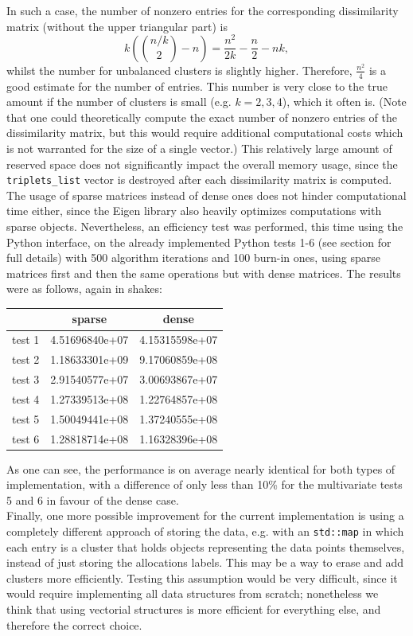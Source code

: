 In such a case, the number of nonzero entries for the corresponding dissimilarity matrix (without the upper triangular part) is
$$ k \left(\binom{n/k}{2} - n\right) = \frac{n^2}{2k} -\frac{n}{2} - nk,$$
whilst the number for unbalanced clusters is slightly higher.
Therefore, $\frac{n^2}{4}$ is a good estimate for the number of entries.
This number is very close to the true amount if the number of clusters is small (e.g. $k=2,3,4$), which it often is. (Note that one could theoretically compute the exact number of nonzero entries of the dissimilarity matrix, but this would require additional computational costs which is not warranted for the size of a single vector.)
This relatively large amount of reserved space does not significantly impact the overall memory usage, since the \verb|triplets_list| vector is destroyed after each dissimilarity matrix is computed. \\
The usage of sparse matrices instead of dense ones does not hinder computational time either, since the Eigen library also heavily optimizes computations with sparse objects.
Nevertheless, an efficiency test was performed, this time using the Python interface, on the already implemented Python tests 1-6 (see section \label{chap-py-test} for full details) with 500 algorithm iterations and 100 burn-in ones, using sparse matrices first and then the same operations but with dense matrices.
The results were as follows, again in shakes:
\begin{center}
	\begin{tabular}{c|c|c}
       &      sparse    &      dense     \\ \hline
test 1 & 4.51696840e+07 & 4.15315598e+07 \\
test 2 & 1.18633301e+09 & 9.17060859e+08 \\
test 3 & 2.91540577e+07 & 3.00693867e+07 \\
test 4 & 1.27339513e+08 & 1.22764857e+08 \\
test 5 & 1.50049441e+08 & 1.37240555e+08 \\
test 6 & 1.28818714e+08 & 1.16328396e+08
	\end{tabular}
\end{center}
As one can see, the performance is on average nearly identical for both types of implementation, with a difference of only less than 10\% for the multivariate tests 5 and 6 in favour of the dense case. \\[8pt]
Finally, one more possible improvement for the current implementation is using a completely different approach of storing the data, e.g. with an \verb|std::map| in which each entry is a cluster that holds objects representing the data points themselves, instead of just storing the allocations labels.
This may be a way to erase and add clusters more efficiently.
Testing this assumption would be very difficult, since it would require implementing all data structures from scratch; nonetheless we think that using vectorial structures is more efficient for everything else, and therefore the correct choice.


